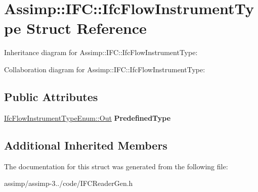 \hypertarget{struct_assimp_1_1_i_f_c_1_1_ifc_flow_instrument_type}{\section{Assimp\+:\+:I\+F\+C\+:\+:Ifc\+Flow\+Instrument\+Type Struct Reference}
\label{struct_assimp_1_1_i_f_c_1_1_ifc_flow_instrument_type}
}


Inheritance diagram for Assimp\+:\+:I\+F\+C\+:\+:Ifc\+Flow\+Instrument\+Type\+:


Collaboration diagram for Assimp\+:\+:I\+F\+C\+:\+:Ifc\+Flow\+Instrument\+Type\+:
\subsection*{Public Attributes}
\begin{DoxyCompactItemize}
\item 
\hypertarget{struct_assimp_1_1_i_f_c_1_1_ifc_flow_instrument_type_a499dbcf913e98cbc9fdcf0f22c553442}{\hyperlink{classboost_1_1shared__ptr}{Ifc\+Flow\+Instrument\+Type\+Enum\+::\+Out} {\bfseries Predefined\+Type}}\label{struct_assimp_1_1_i_f_c_1_1_ifc_flow_instrument_type_a499dbcf913e98cbc9fdcf0f22c553442}

\end{DoxyCompactItemize}
\subsection*{Additional Inherited Members}


The documentation for this struct was generated from the following file\+:\begin{DoxyCompactItemize}
\item 
assimp/assimp-\/3../code/I\+F\+C\+Reader\+Gen.\+h\end{DoxyCompactItemize}
